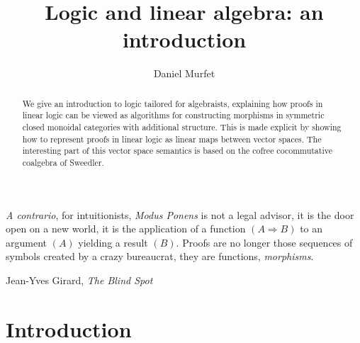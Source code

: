 \documentclass[english,letter paper,12pt,reqno]{article}
\theoremstyle{example}
\numberwithin{equation}{section}
\def\res{\operatorname{Res}}
\begin{document}
\def\ScoreOverhang{1pt}

\def\Res{\res\!}
\newcommand{\ud}[1]{\operatorname{d}\!{#1}}
\newcommand{\Ress}[1]{\res_{#1}\!}
\newcommand{\cat}[1]{\mathcal{#1}}
\newcommand{\lto}{\longrightarrow}
\newcommand{\xlto}[1]{\stackrel{#1}\lto}
\newcommand{\mf}[1]{\mathfrak{#1}}
\newcommand{\md}[1]{\mathscr{#1}}
\newcommand{\church}[1]{\underline{#1}}
\newcommand{\prf}[1]{\underline{#1}}
\newcommand{\den}[1]{\llbracket #1 \rrbracket}
\def\l{\,|\,}
\def\sgn{\textup{sgn}}
\def\cont{\operatorname{cont}}

\title{Logic and linear algebra: an introduction}
\author{Daniel Murfet}

\maketitle

\begin{abstract} We give an introduction to logic tailored for algebraists, explaining how proofs in linear logic can be viewed as algorithms for constructing morphisms in symmetric closed monoidal categories with additional structure. This is made explicit by showing how to represent proofs in linear logic as linear maps between vector spaces. The interesting part of this vector space semantics is based on the cofree cocommutative coalgebra of Sweedler.
\end{abstract}

\setlength{\epigraphwidth}{0.6\textwidth}
\epigraph{\emph{A contrario}, for intuitionists, \emph{Modus Ponens} is not a legal advisor, it is the door open on a new world, it is the application of a function $(A \Rightarrow B)$ to an argument $(A)$ yielding a result $(B)$. Proofs are no longer those sequences of symbols created by a crazy bureaucrat, they are functions, \emph{morphisms}.}{Jean-Yves Girard, \textit{The Blind Spot}}

\tableofcontents

\section{Introduction}

\end{document}
